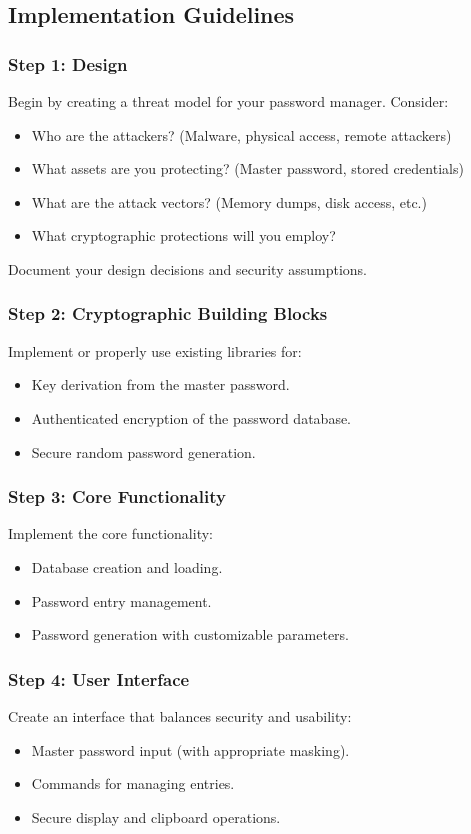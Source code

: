 \documentclass[10pt,a4paper,american]{exam}
\begin{document}
\subsection*{Implementation Guidelines}

\subsubsection*{Step 1: Design}
Begin by creating a threat model for your password manager. Consider:
\begin{itemize}
	\item Who are the attackers? (Malware, physical access, remote attackers)
	\item What assets are you protecting? (Master password, stored credentials)
	\item What are the attack vectors? (Memory dumps, disk access, etc.)
	\item What cryptographic protections will you employ?
\end{itemize}

Document your design decisions and security assumptions.

\subsubsection*{Step 2: Cryptographic Building Blocks}
Implement or properly use existing libraries for:
\begin{itemize}
	\item Key derivation from the master password.
	\item Authenticated encryption of the password database.
	\item Secure random password generation.
\end{itemize}

\subsubsection*{Step 3: Core Functionality}
Implement the core functionality:
\begin{itemize}
	\item Database creation and loading.
	\item Password entry management.
	\item Password generation with customizable parameters.
\end{itemize}

\subsubsection*{Step 4: User Interface}
Create an interface that balances security and usability:
\begin{itemize}
	\item Master password input (with appropriate masking).
	\item Commands for managing entries.
	\item Secure display and clipboard operations.
\end{itemize}
\end{document}
